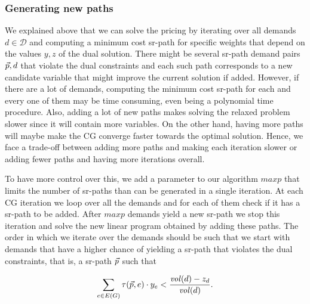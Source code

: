 
\subsubsection*{Generating new paths}

We explained above that we can solve the pricing by iterating over all demands $d \in \mathcal{D}$ and computing a minimum cost sr-path for
specific weights that depend on the values $y, z$ of the dual solution. There might be several sr-path demand pairs $\vec{p}, d$ that violate
 the dual constraints and each such path corresponds to a new candidate variable that might improve the current solution if added. However,
if there are a lot of demands, computing the minimum cost sr-path for each and every one of them may be time consuming, even being a polynomial time procedure. Also, adding a lot of new paths
makes solving the relaxed problem slower since it will contain more variables. On the other hand, having more paths will maybe make the CG converge faster 
towards the optimal solution. Hence, we face a trade-off between adding more paths and making each iteration slower or adding fewer paths and having more iterations overall.

To have more control over this, we add a parameter to our algorithm $maxp$ that limits the number of sr-paths than can be generated in a single iteration.
At each CG iteration we loop over all the demands and for each of them check if it has a sr-path to be added. After $maxp$ demands yield a new sr-path we stop this iteration
and solve the new linear program obtained by adding these paths. The order in which we iterate over the demands should be such that we start with demands that have a higher
chance of yielding a sr-path that violates the dual constraints, that is, a sr-path $\vec{p}$ such that

$$
\sum_{e \in E(G)} \tau(\vec{p}, e) \cdot y_e < \frac{\mathit{vol}(d) - z_d}{\mathit{vol}(d)}.
$$

